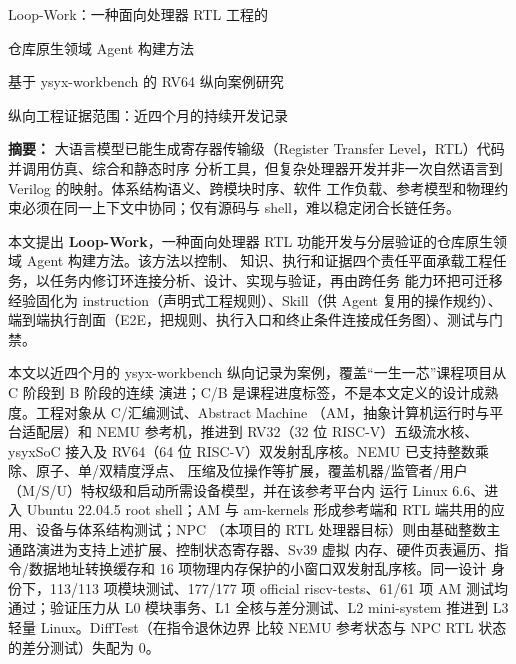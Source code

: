 \documentclass[UTF8,a4paper,zihao=-4,oneside]{ctexart}
\begin{document}
\thispagestyle{plain}
\begin{center}
  {\heiti Loop-Work：一种面向处理器 RTL 工程的\par}
  \vspace{0.35em}
  {\heiti 仓库原生领域 Agent 构建方法\par}
  \vspace{0.35em}
  {\heiti 基于 ysyx-workbench 的 RV64 纵向案例研究\par}
  \vspace{0.7em}
  {纵向工程证据范围：近四个月的持续开发记录\par}
\end{center}

\vspace{0.7em}
\noindent\textbf{摘\quad 要：}
大语言模型已能生成寄存器传输级（Register Transfer Level，RTL）代码并调用仿真、综合和静态时序
分析工具，但复杂处理器开发并非一次自然语言到 Verilog 的映射。体系结构语义、跨模块时序、软件
工作负载、参考模型和物理约束必须在同一上下文中协同；仅有源码与 shell，难以稳定闭合长链任务。

本文提出 \textbf{Loop-Work}，一种面向处理器 RTL 功能开发与分层验证的仓库原生领域 Agent 构建方法。该方法以控制、
知识、执行和证据四个责任平面承载工程任务，以任务内修订环连接分析、设计、实现与验证，再由跨任务
能力环把可迁移经验固化为 instruction（声明式工程规则）、Skill（供 Agent 复用的操作规约）、
端到端执行剖面（E2E，把规则、执行入口和终止条件连接成任务图）、测试与门禁。

本文以近四个月的 ysyx-workbench 纵向记录为案例，覆盖“一生一芯”课程项目从 C 阶段到 B 阶段的连续
演进；C/B 是课程进度标签，不是本文定义的设计成熟度。工程对象从 C/汇编测试、Abstract Machine
（AM，抽象计算机运行时与平台适配层）和 NEMU 参考机，推进到 RV32（32 位 RISC-V）五级流水核、
ysyxSoC 接入及 RV64（64 位 RISC-V）双发射乱序核。NEMU 已支持整数乘除、原子、单/双精度浮点、
压缩及位操作等扩展，覆盖机器/监管者/用户（M/S/U）特权级和启动所需设备模型，并在该参考平台内
运行 Linux 6.6、进入 Ubuntu 22.04.5 root shell；AM 与
am-kernels 形成参考端和 RTL 端共用的应用、设备与体系结构测试；NPC
（本项目的 RTL 处理器目标）则由基础整数主通路演进为支持上述扩展、控制状态寄存器、Sv39 虚拟
内存、硬件页表遍历、指令/数据地址转换缓存和 16 项物理内存保护的小窗口双发射乱序核。同一设计
身份下，113/113 项模块测试、177/177 项 official riscv-tests、61/61 项 AM 测试均通过；验证压力从
L0 模块事务、L1 全核与差分测试、L2 mini-system 推进到 L3 轻量 Linux。DiffTest（在指令退休边界
比较 NEMU 参考状态与 NPC RTL 状态的差分测试）失配为 0。
\end{document}
